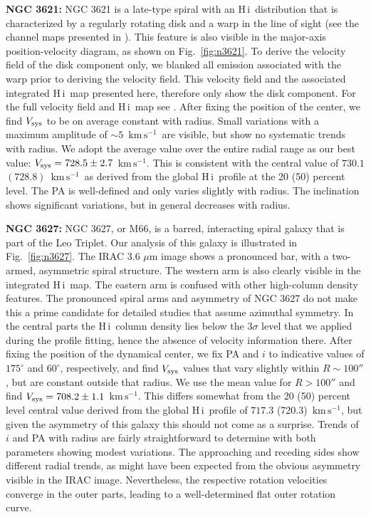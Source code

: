 \documentclass[usenatbib,usegraphicx,apjfonts,floatfix]{emulateapj}
\newcommand{\kms}{\ensuremath{\,\mbox{km}\,\mbox{s}^{-1}}}
\newcommand{\HI}{H\,{\sc i}}
\begin{document}
{\bf NGC 3621:} NGC 3621 is a late-type spiral with an
\HI\ distribution that is characterized by a regularly rotating disk
and a warp in the line of sight (see the channel maps presented in
\citealt{THINGS1}). This feature is also visible in the major-axis
position-velocity diagram, as shown on Fig.~\ref{fig:n3621}. To derive
the velocity field of the disk component only, we blanked all emission
associated with the warp prior to deriving the velocity field.  This
velocity field and the associated integrated \HI\ map presented here,
therefore only show the disk component. For the full velocity field
and \HI\ map see \citet{THINGS1}.  After fixing the position of the
center, we find $V_{\rm sys}$ to be on average constant with
radius. Small variations with a maximum amplitude of $\sim 5$
\kms\ are visible, but show no systematic trends with radius. We adopt
the average value over the entire radial range as our best value:
$V_{\rm sys} = 728.5 \pm 2.7$ \kms. This is consistent with the
central value of $730.1$ $(728.8)$ \kms\ as derived from the global
\HI\ profile at the 20 (50) percent level.  The PA is well-defined and
only varies slightly with radius. The inclination shows significant
variations, but in general decreases with radius.

{\bf NGC 3627:} NGC 3627, or M66, is a barred, interacting spiral
galaxy that is part of the Leo Triplet. Our analysis of this galaxy is
illustrated in Fig.~\ref{fig:n3627}.  The IRAC 3.6 $\mu$m image shows
a pronounced bar, with a two-armed, asymmetric spiral structure. The
western arm is also clearly visible in the integrated \HI\ map. The
eastern arm is confused with other high-column density features.  The
pronounced spiral arms and asymmetry of NGC 3627 do not make this a
prime candidate for detailed studies that assume azimuthal symmetry.
In the central parts the \HI\ column density lies below the 3$\sigma$
level that we applied during the profile fitting, hence the absence of
velocity information there.
After fixing the position of the dynamical center, we fix PA and $i$
to indicative values of $175^{\circ}$ and $60^{\circ}$, respectively, and
find  $V_{\rm sys}$ values that vary slightly within $R\sim 100''$, but
are constant outside that radius.  We use the mean value for $R>100''$
and find $V_{\rm sys} = 708.2 \pm 1.1$ \kms. This differs somewhat
from the 20 (50) percent level central value derived from the global
\HI\ profile of $717.3$ (720.3) \kms, but given the asymmetry of this
galaxy this should not come as a surprise. Trends of $i$ and PA with
radius are fairly straightforward to determine with both parameters
showing modest variations. The approaching and receding sides show
different radial trends, as might have been expected from the obvious
asymmetry visible in the IRAC image.  Nevertheless, the respective
rotation velocities converge in the outer parts, leading to a
well-determined flat outer rotation curve. 
\end{document}
